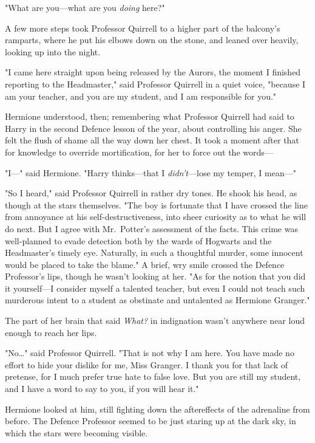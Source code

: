 "What are you---what are you \emph{doing} here?"

A few more steps took Professor Quirrell to a higher part of the balcony's
ramparts, where he put his elbows down on the stone, and leaned over heavily,
looking up into the night.

"I came here straight upon being released by the Aurors, the moment I finished
reporting to the Headmaster," said Professor Quirrell in a quiet voice,
"because I am your teacher, and you are my student, and I am responsible for
you."

Hermione understood, then; remembering what Professor Quirrell had said to
Harry in the second Defence lesson of the year, about controlling his anger.
She felt the flush of shame all the way down her chest. It took a moment after
that for knowledge to override mortification, for her to force out the words---

"I---" said Hermione. "Harry thinks---that I \emph{didn't}---lose my temper, I
mean---"

"So I heard," said Professor Quirrell in rather dry tones. He shook his head,
as though at the stars themselves. "The boy is fortunate that I have crossed
the line from annoyance at his self-destructiveness, into sheer curiosity as
to what he will do next. But I agree with Mr.~Potter's assessment of the
facts. This crime was well-planned to evade detection both by the wards of
Hogwarts and the Headmaster's timely eye. Naturally, in such a thoughtful
murder, some innocent would be placed to take the blame." A brief, wry smile
crossed the Defence Professor's lips, though he wasn't looking at her. "As for
the notion that you did it yourself---I consider myself a talented teacher, but
even I could not teach such murderous intent to a student as obstinate and
untalented as Hermione Granger."

The part of her brain that said \emph{What?} in indignation wasn't anywhere
near loud enough to reach her lips.

"No{\ldots}" said Professor Quirrell. "That is not why I am here. You have made
no effort to hide your dislike for me, Miss Granger. I thank you for that lack
of pretense, for I much prefer true hate to false love. But you are still my
student, and I have a word to say to you, if you will hear it."

Hermione looked at him, still fighting down the aftereffects of the adrenaline
from before. The Defence Professor seemed to be just staring up at the dark
sky, in which the stars were becoming visible.

